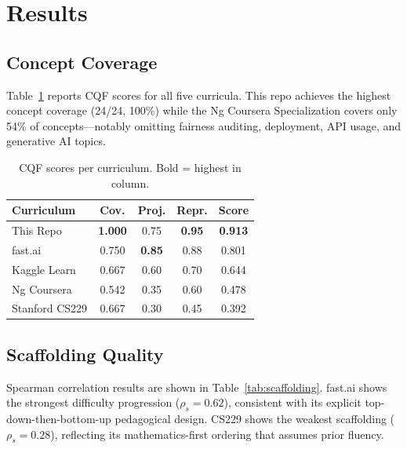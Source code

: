 \documentclass[10pt,twocolumn]{article}
\begin{document}
\section{Results}

\subsection{Concept Coverage}

Table~\ref{tab:scores} reports CQF scores for all five curricula.
This repo achieves the highest concept coverage (24/24, 100\%) while the 
Ng Coursera Specialization covers only 54\% of concepts—notably omitting 
fairness auditing, deployment, API usage, and generative AI topics.

\begin{table}[h]
\centering
\caption{CQF scores per curriculum. Bold = highest in column.}
\label{tab:scores}
\small
\begin{tabular}{lcccc}
\toprule
\textbf{Curriculum} & \textbf{Cov.} & \textbf{Proj.} & \textbf{Repr.} & \textbf{Score} \\
\midrule
This Repo    & \textbf{1.000} & 0.75 & \textbf{0.95} & \textbf{0.913} \\
fast.ai      & 0.750 & \textbf{0.85} & 0.88 & 0.801 \\
Kaggle Learn & 0.667 & 0.60 & 0.70 & 0.644 \\
Ng Coursera  & 0.542 & 0.35 & 0.60 & 0.478 \\
Stanford CS229 & 0.667 & 0.30 & 0.45 & 0.392 \\
\bottomrule
\end{tabular}
\end{table}

\subsection{Scaffolding Quality}

Spearman correlation results are shown in Table~\ref{tab:scaffolding}.
fast.ai shows the strongest difficulty progression ($\rho_s = 0.62$), 
consistent with its explicit top-down-then-bottom-up pedagogical design.
CS229 shows the weakest scaffolding ($\rho_s = 0.28$), reflecting its 
mathematics-first ordering that assumes prior fluency.
\end{document}
